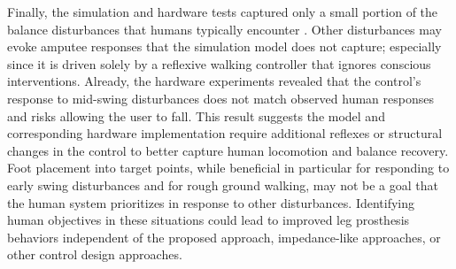 Finally, the simulation and hardware tests captured only a small
portion of the balance disturbances that humans typically encounter
\citep{robinovitch2013video}. Other disturbances may evoke amputee responses
that the simulation model does not capture; especially since it is driven
solely by a reflexive walking controller that ignores conscious interventions.
Already, the hardware experiments revealed that the control's response to
mid-swing disturbances does not match observed human responses and risks
allowing the user to fall. This result suggests the model and corresponding
hardware implementation require additional reflexes or structural changes in
the control to better capture human locomotion and balance recovery. Foot
placement into target points, while beneficial in particular for responding to
early swing disturbances and for rough ground walking, may not be a goal that
the human system prioritizes in response to other disturbances. Identifying
human objectives in these situations could lead to improved leg prosthesis
behaviors independent of the proposed approach, impedance-like approaches, or
other control design approaches.

